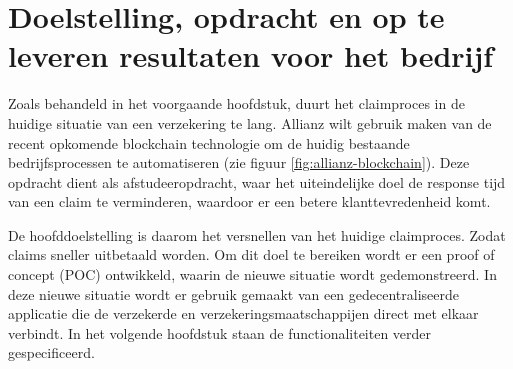 \chapter{Doelstelling, opdracht en op te leveren resultaten voor het bedrijf}
Zoals behandeld in het voorgaande hoofdstuk, duurt het claimproces in de huidige situatie van een verzekering te lang. Allianz wilt gebruik maken van de recent opkomende blockchain technologie om de huidig bestaande bedrijfsprocessen te automatiseren (zie figuur \ref{fig:allianz-blockchain}). Deze opdracht dient als afstudeeropdracht, waar het uiteindelijke doel de response tijd van een claim te verminderen, waardoor er een betere klanttevredenheid komt.\par

De hoofddoelstelling is daarom het versnellen van het huidige claimproces. Zodat claims sneller uitbetaald worden. Om dit doel te bereiken wordt er een proof of concept (POC) ontwikkeld, waarin de nieuwe situatie wordt gedemonstreerd. In deze nieuwe situatie wordt er gebruik gemaakt van een gedecentraliseerde applicatie die de verzekerde en verzekeringsmaatschappijen direct met elkaar verbindt. In het volgende hoofdstuk staan de functionaliteiten verder gespecificeerd.\par

